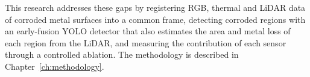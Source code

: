 This research addresses these gaps by registering RGB, thermal and LiDAR data of
corroded metal surfaces into a common frame, detecting corroded regions with an
early-fusion YOLO detector that also estimates the area and metal loss of each
region from the LiDAR, and measuring the contribution of each sensor through a
controlled ablation. The methodology is described in Chapter~\ref{ch:methodology}.
